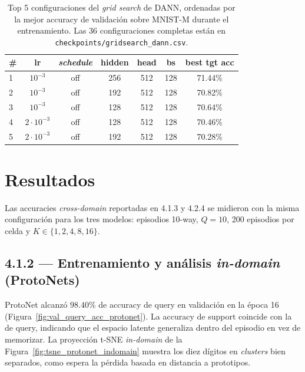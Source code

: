 \documentclass[12pt]{article}
\begin{document}
\begin{table}[H]
    \centering
    \begin{tabular}{lcccccc}
        \hline
        \# & lr & \textit{schedule} & hidden & head & bs & best tgt acc \\
        \hline
        1 & $10^{-3}$     & off & 256 & 512 & 128 & 71.44\% \\
        2 & $10^{-3}$     & off & 192 & 512 & 128 & 70.82\% \\
        3 & $10^{-3}$     & off & 128 & 512 & 128 & 70.64\% \\
        4 & $2\cdot 10^{-3}$ & off & 128 & 512 & 128 & 70.46\% \\
        5 & $2\cdot 10^{-3}$ & off & 192 & 512 & 128 & 70.28\% \\
        \hline
    \end{tabular}
    \caption{Top 5 configuraciones del \textit{grid search} de DANN, ordenadas por la mejor accuracy de validación sobre MNIST-M durante el entrenamiento. Las 36 configuraciones completas están en \texttt{checkpoints/gridsearch\_dann.csv}.}
    \label{tab:gs_dann_top5}
\end{table}

\section{Resultados}

Las accuracies \textit{cross-domain} reportadas en 4.1.3 y 4.2.4 se midieron con la misma configuración para los tres modelos: episodios 10-way, $Q=10$, 200 episodios por celda y $K \in \{1, 2, 4, 8, 16\}$.

\subsection{4.1.2 — Entrenamiento y análisis \textit{in-domain} (ProtoNets)}

ProtoNet alcanzó $98.40\%$ de accuracy de query en validación en la época 16 (Figura~\ref{fig:val_query_acc_protonet}). La accuracy de support coincide con la de query, indicando que el espacio latente generaliza dentro del episodio en vez de memorizar. La proyección t-SNE \textit{in-domain} de la Figura~\ref{fig:tsne_protonet_indomain} muestra los diez dígitos en \textit{clusters} bien separados, como espera la pérdida basada en distancia a prototipos.
\end{document}
